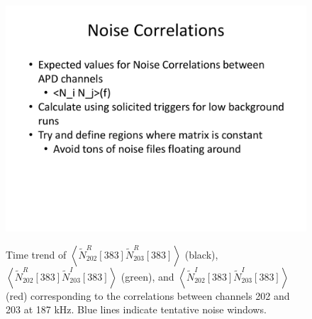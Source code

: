 \begin{figure}
\begin{center}
\includegraphics[keepaspectratio=true,page=5,width=\textwidth,clip=true,trim=0.2in 0.5in 0.5in 0.3in]{APD_Denoising_noise_correlations.pdf}
\end{center}
\renewcommand{\baselinestretch}{1}
\small\normalsize
\begin{quote}
\caption{Time trend of $\left<\widetilde{N}^R_{202}[383]\widetilde{N}^R_{203}[383]\right>$ (black), $\left<\widetilde{N}^R_{202}[383]\widetilde{N}^I_{203}[383]\right>$ (green), and $\left<\widetilde{N}^I_{202}[383]\widetilde{N}^I_{203}[383]\right>$ (red) corresponding to the correlations between channels 202 and 203 at 187 kHz.  Blue lines indicate tentative noise windows.~\cite{MikeCoherentAPDNoise}}
\label{fig:MikeNoise_202_203}
\end{quote}
\end{figure}
\renewcommand{\baselinestretch}{2}
\small\normalsize

